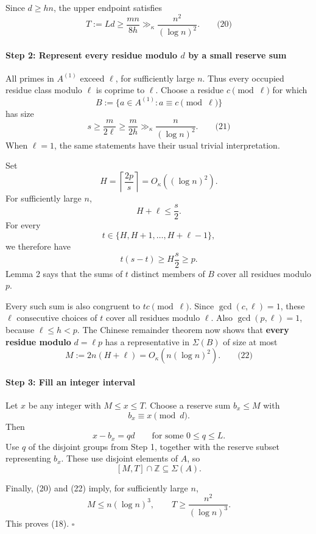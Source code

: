 \documentclass[
  11pt,
  a4paper,
]{article}
\begin{document}
Since \(d\ge hn\), the upper endpoint satisfies \[
T:=Ld\ge\frac{mn}{8h}
\gg_\kappa \frac{n^2}{(\log n)^2}.
\qquad\text{(20)}
\]

\paragraph{\texorpdfstring{Step 2: Represent every residue modulo \(d\)
by a small reserve
sum}{Step 2: Represent every residue modulo d by a small reserve sum}}\label{step-2-represent-every-residue-modulo-d-by-a-small-reserve-sum}

All primes in \(A^{(1)}\) exceed \(\ell\), for sufficiently large \(n\).
Thus every occupied residue class modulo \(\ell\) is coprime to
\(\ell\). Choose a residue \(c\pmod\ell\) for which \[
B:=\{a\in A^{(1)}:a\equiv c\pmod\ell\}
\] has size \[
s\ge\frac{m}{2\ell}
\ge\frac{m}{2h}
\gg_\kappa\frac{n}{(\log n)^2}.
\qquad\text{(21)}
\] When \(\ell=1\), the same statements have their usual trivial
interpretation.

Set \[
H=\left\lceil\frac{2p}{s}\right\rceil
=O_\kappa((\log n)^2).
\] For sufficiently large \(n\), \[
H+\ell\le \frac s2.
\] For every \[
t\in\{H,H+1,\ldots,H+\ell-1\},
\] we therefore have \[
t(s-t)\ge H\frac s2\ge p.
\] Lemma 2 says that the sums of \(t\) distinct members of \(B\) cover
all residues modulo \(p\).

Every such sum is also congruent to \(tc\pmod\ell\). Since
\(\gcd(c,\ell)=1\), these \(\ell\) consecutive choices of \(t\) cover
all residues modulo \(\ell\). Also \(\gcd(p,\ell)=1\), because
\(\ell\le h<p\). The Chinese remainder theorem now shows that
\textbf{every residue modulo} \(d=\ell p\) has a representative in
\(\Sigma(B)\) of size at most \[
M:=2n(H+\ell)=O_\kappa(n(\log n)^2).
\qquad\text{(22)}
\]

\paragraph{Step 3: Fill an integer
interval}\label{step-3-fill-an-integer-interval}

Let \(x\) be any integer with \(M\le x\le T\). Choose a reserve sum
\(b_x\le M\) with \[
b_x\equiv x\pmod d.
\] Then \[
x-b_x=qd
\qquad\text{for some }0\le q\le L.
\] Use \(q\) of the disjoint groups from Step 1, together with the
reserve subset representing \(b_x\). These use disjoint elements of
\(A\), so \[
[M,T]\cap\mathbb Z\subseteq\Sigma(A).
\]

Finally, (20) and (22) imply, for sufficiently large \(n\), \[
M\le n(\log n)^3,\qquad
T\ge\frac{n^2}{(\log n)^3}.
\] This proves (18). \(\square\)
\end{document}
